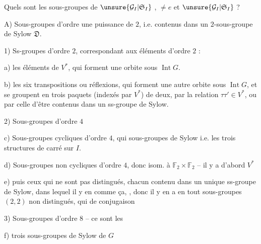 Quels sont les sous-groupes de $\unsure{\mathcal{G}_I|\mathfrak{S}_I}$ , $\ne e$ et $\unsure{\mathcal{G}_I|\mathfrak{S}_I}$ ?

A) Sous-groupes d'ordre une puissance de $2$, i.e. contenus dans un $2$-sous-groupe de Sylow $\mathfrak{D}$.


1) Ss-groupes d'ordre $2$, correspondant aux éléments d'ordre $2$ :

a) les  éléments de $V^*$, qui forment une orbite sous $\operatorname{Int}G$.

b) les six transpositions ou réflexions, qui forment une autre orbite sous $\operatorname{Int}G$, et se groupent en trois paquets (indexés par $V^*$) de deux, par la relation $\tau\tau'\in V^*$, ou par celle d'être contenus dans un ss-groupe de Sylow.

2) Sous-groupes d'ordre $4$

c)  Sous-groupes cycliques d'ordre $4$, qui  sous-groupes de Sylow i.e. les trois structures de carré sur $I$.

d) Sous-groupes non cycliques d'ordre $4$, donc isom. à $\mathbb{F}_2\times\mathbb{F}_2$ -- il y a d'abord $V^*$

e) puis ceux qui ne sont pas distingués, chacun contenu dans un unique ss-groupe de Sylow, dans lequel il y en  comme ça, , donc il y en a en tout  sous-groupes  $(2,2)$ non distingués, qui   de conjugaison 

3) Sous-groupes d'ordre $8$ -- ce sont les

f) trois sous-groupes de Sylow de $G$
